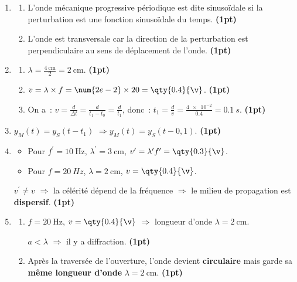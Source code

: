 \begin{enumerate}
    \item 
          \begin{enumerate}
              \item L'onde mécanique progressive périodique est dite sinusoïdale
                    si la perturbation est une fonction sinusoïdale du temps. 
                    \textbf{(1pt)}
              \item L'onde est transversale car la direction de la perturbation
                    est perpendiculaire au sens de déplacement de l'onde.
                    \textbf{(1pt)}
          \end{enumerate}
    \item 
          \begin{enumerate}
              \item $\lambda=\frac{\qty{4}{\cm}}{2}=\qty{2}{\cm}$.
                    \textbf{(1pt)}
              \item $v=\lambda\times f=\num{2e-2}\times20=\qty{0.4}{\v}$.
                    \textbf{(1pt)}
              \item On a~:
                    $v=\frac{d}{\Delta t}=\frac{d}{t_{1}-t_{0}}=
                    \frac{d}{t_{1}}$, donc~:
                    $t_1=\frac{d}{v}=\frac{\num{4e-2}}{\num{0.4}}=\qty{0.1}{s}$.
                    \textbf{(1pt)}
          \end{enumerate}

      \item $y_{M}(t)=y_{S}(t-t_{1})$ $\Rightarrow y_{M}(t)=y_{S}(t-0,1)$.
          \textbf{(1pt)}
  
    \item
          \begin{itemize}
              \item Pour $f^{\prime}=\qty{10}{\Hz}$, $\lambda^{\prime}=\qty{3}{\cm}$,
                    $v^{\prime}=\lambda^{\prime}f^{\prime}=\qty{0.3}{\v}$.  
              \item Pour $f=\qty{20}{Hz}$, $\lambda=\qty{2}{\cm}$,
                    $v=\qty{0.4}{\v}$.  
          \end{itemize}
          $v^{\prime}\neq v$ $\Rightarrow$ la célérité dépend de la fréquence
          $\Rightarrow$ le milieu de propagation est \textbf{dispersif}.
          \textbf{(1pt)}
    \item 
          \begin{enumerate}
              \item $f=\qty{20}{\Hz}$, $v=\qty{0.4}{\v}$ $\Rightarrow$
                    longueur d'onde $\lambda=\qty{2}{\cm}$.

                    $a<\lambda$ $\Rightarrow$ il y a diffraction.
                    \textbf{(1pt)}
              \item Après la traversée de l'ouverture, l'onde devient
                    \textbf{circulaire} mais garde sa \textbf{même longueur
                    d'onde} $\lambda=\qty{2}{\cm}$.
                    \textbf{(1pt)}
          \end{enumerate}
\end{enumerate}

